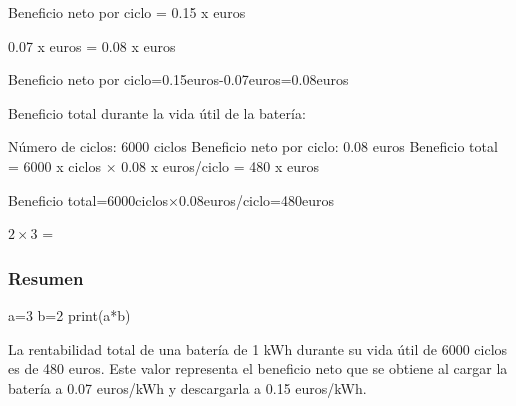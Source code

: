 \documentclass[a4paper,12pt]{article}
\begin{document}
\begin{Form}
Beneficio neto por ciclo
=
0.15
x
euros

0.07
x
euros
=
0.08
x
euros

Beneficio neto por ciclo=0.15euros-0.07euros=0.08euros

Beneficio total durante la vida útil de la batería:

Número de ciclos: 6000 ciclos
Beneficio neto por ciclo: 0.08 euros
Beneficio total
=
6000
x
ciclos
×
0.08
x
euros/ciclo
=
480
x
euros



Beneficio total=6000ciclos×0.08euros/ciclo=480euros

$2 \times 3$ = 

\subsubsection*{Resumen}

a=3
b=2
print(a*b)


La rentabilidad total de una batería de 1 kWh durante su vida útil de 6000 ciclos es de 480 euros. Este valor representa el beneficio neto que se obtiene al cargar la batería a 0.07 euros/kWh y descargarla a 0.15 euros/kWh.





\end{Form}
\end{document}
